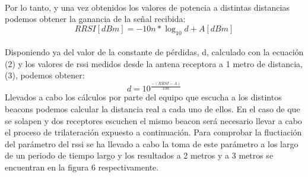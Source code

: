 \documentclass[paper=a4, fontsize=11pt,twoside]{scrartcl}	%
\begin{document}
            \paragraph{}
            Por lo tanto, y una vez obtenidos los valores de potencia a distintas distancias podemos obtener la ganancia
            de la señal recibida:
            \begin{equation}
                RRSI [dBm] = -10n*\log_{10} d+ A[dBm]
            \end{equation}
            \paragraph{}
            Disponiendo ya del valor de la constante de pérdidas, d, calculado con la ecuación (2) y los valores
            de rssi medidos desde la antena receptora a 1 metro de distancia, (3), podemos obtener:
            \begin{equation}
                d= 10^\frac{-(RRSI - A)}{10n}
            \end{equation}
            Llevados a cabo los cálculos por parte del equipo que escucha a los distintos beacons podemos calcular la distancia 
            real a cada uno de ellos. En el caso de que se solapen y dos receptores escuchen el mismo beacon será necesario
            llevar a cabo el proceso de trilateración expuesto a continuación.
            Para comprobar la fluctiación del parámetro del rssi se ha llevado a cabo la toma de este parámetro a los largo de un 
            periodo de tiempo largo y los resultados a 2 metros y a 3 metros se encuentran en la figura 6 respectivamente. 
\end{document}

